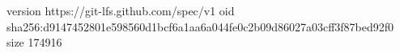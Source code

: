 version https://git-lfs.github.com/spec/v1
oid sha256:d9147452801e598560d1bcf6a1aa6a044fe0c2b09d86027a03cff3f87bed92f0
size 174916
